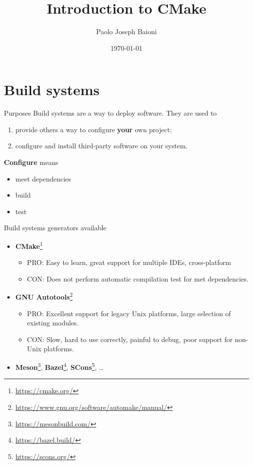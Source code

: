 \documentclass[aspectratio=169,11pt]{beamer}
\title{Introduction to CMake}
\author{Paolo Joseph Baioni}
\institute{Politecnico di Milano}
\date{\today}
\begin{document}
\begin{frame}[plain]{}
    \maketitle
\end{frame}

\section{Build systems}
\begin{frame}{Purposes}
    Build systems are a way to deploy software.
    \vfill
    They are used to
    \begin{enumerate}
        \item provide others a way to configure \textbf{your} own project;
        \item configure and install third-party software on your system.
    \end{enumerate}
    \vfill
    \textbf{Configure} means
    \begin{itemize}
        \item meet dependencies
        \item build
        \item test
    \end{itemize}
\end{frame}

\begin{frame}{Build systems generators available}
    \begin{itemize}
    \item \textbf{CMake}\footnote{\url{https://cmake.org/}}
    \begin{itemize}
    \item PRO: Easy to learn, great support for multiple IDEs, cross-platform
    \item CON: Does not perform automatic compilation test for met dependencies.
    \end{itemize}
    \item \textbf{GNU Autotools}\footnote{\url{https://www.gnu.org/software/automake/manual/}}
    \begin{itemize}
    \item PRO: Excellent support for legacy Unix platforms, large selection of existing modules.
    \item CON: Slow, hard to use correctly, painful to debug, poor support for non-Unix platforms.
    \end{itemize}
    \item \textbf{Meson}\footnote{\url{https://mesonbuild.com/}}, \textbf{Bazel}\footnote{\url{https://bazel.build/}}, \textbf{SCons}\footnote{\url{https://scons.org/}}, \dots
    \end{itemize}
\end{frame}
\end{document}
